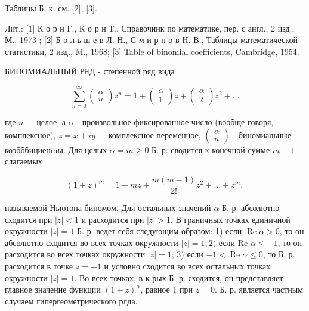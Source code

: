 \documentclass[10pt]{article}
\begin{document}
Таблицы Б. к. см. [2], [3].



Лит.: [1] К о р н Г., К о р н Т., Справочник по математике, пер. с англ., 2 изд., М., 1973 ; [2] Б о л ь ш е в Л. Н., С м и р н о в H. В., Таблицы математической статистики, 2 изд., M., 1968; [3] Table of binomial coefficients, Cambridge, 1954.



БИНОМИАЛЬНЫЙ РЯД - степенной ряд вида



\[

\sum_{n=0}^{\infty}\left(\begin{array}{l}

\alpha \\

n

\end{array}\right) z^{n}=1+\left(\begin{array}{c}

\alpha \\

1

\end{array}\right) z+\left(\begin{array}{l}

\alpha \\

2

\end{array}\right) z^{2}+\ldots

\]



где $n-$ целое, а $\alpha$ - произвольное фиксированное число (вообще говоря, комплексное), $z=x+i y-$ комплексное переменное, $\left(\begin{array}{l}\alpha \\ n\end{array}\right)$ - биномиальные коэбббициенmы. Для целых $\alpha=m \geqslant 0$ Б. р. сводится к конечной сумме $m+1$ слагаемых



\[

(1+z)^{m}=1+m z+\frac{m(m-1)}{2 !} z^{2}+\ldots+z^{m},

\]



называемой Ньютона биномом. Для остальных значений $\alpha$ Б. р. абсолютно сходится при $|z|<1$ и расходится при $|z|>1$. В граничных точках единичной окружности $|z|=1$ Б. р. ведет себя следующим образом: 1) если $\operatorname{Re} \alpha>0$, то он абсолютно сходится во всех точках окружности $|z|=1 ; 2)$ если Re $\alpha \leqslant-1$, то он расходится во всех точках окружности $|z|=1$; 3) если $-1<\operatorname{Re} \alpha \leqslant 0$, то Б. р. расходится в точке $z=-1$ и условно сходится во всех остальных точках окружности $|z|=1$. Во всех точках, в к-рых Б. р. сходится, он представляет главное значение функции $(1+z)^{\alpha}$, равное 1 при $z=0$. Б. р. является частным случаем гипергеометрического рлда.
\end{document}

